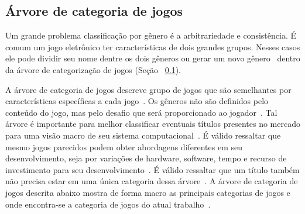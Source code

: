 \subsection{Árvore de categoria de jogos}
\label{sec:arvore_de_categoria_de_jogos}



Um grande problema classificação por gênero é a arbitrariedade e consistência.
%
É comum um jogo eletrônico ter características de dois grandes grupos.
%
Nesses casos ele pode dividir seu nome dentre os dois gêneros ou gerar um novo gênero~\cite{video_game_technologies} dentro da árvore de categorização de jogos (Seção ~\ref{sec:arvore_de_categoria_de_jogos}).



A árvore de categoria de jogos descreve grupo de jogos que são semelhantes por características específicas a cada jogo~\cite{video_game_technologies, Adams2014Jan}.
%
Os gêneros não são definidos pelo conteúdo do jogo, mas pelo desafio que será proporcionado ao jogador~\cite{Adams2014Jan}.
%
Tal árvore é importante para melhor classificar eventuais títulos presentes no mercado para uma visão macro de seu sistema computacional~\cite{video_game_technologies}.
%
É válido ressaltar que mesmo jogos parecidos podem obter abordagens diferentes em seu desenvolvimento, seja por variações de hardware, software, tempo e recurso de investimento para seu desenvolvimento~\cite{Adams2014Jan}.
%
É válido ressaltar que um título também não precisa estar em uma única categoria dessa árvore~\cite{video_game_technologies}.
%
A árvore de categoria de jogos descrita abaixo mostra de forma macro as principais categorias de jogos e onde encontra-se a categoria de jogos do atual trabalho~\cite{video_game_technologies}.

